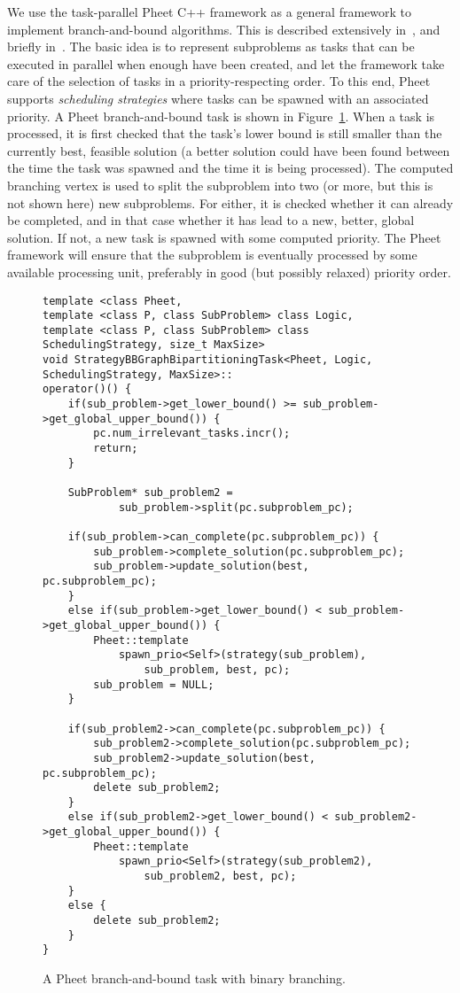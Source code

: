 \documentclass[a4paper,11pt]{article}
\begin{document}
We use the task-parallel Pheet C++ framework as a general framework to
implement branch-and-bound algorithms. This is described extensively
in~\cite{Wimmer14:diss}, and briefly
in~\cite{Traff13:strategies,Traff14:priosched}. The basic idea is to
represent subproblems as tasks that can be executed in parallel when
enough have been created, and let the framework take care of the
selection of tasks in a priority-respecting order. To this end, Pheet
supports \emph{scheduling strategies} where tasks can be spawned with
an associated priority. A Pheet branch-and-bound task is shown in
Figure~\ref{fig:bbtask}. When a task is processed, it is first checked
that the task's lower bound is still smaller than the currently best,
feasible solution (a better solution could have been found between
the time the task was spawned and the time it is being processed).
The computed branching vertex is used to split the subproblem into two
(or more, but this is not shown here) new subproblems. For either, it
is checked whether it can already be completed, and in that case
whether it has lead to a new, better, global solution. If not, a new
task is spawned with some computed priority. The Pheet framework
will ensure that the subproblem is eventually processed by some
available processing unit, preferably in good (but possibly relaxed)
priority order.

\begin{figure}
\begin{lstlisting}[mathescape=true,columns=flexible]
template <class Pheet, 
template <class P, class SubProblem> class Logic, 
template <class P, class SubProblem> class SchedulingStrategy, size_t MaxSize>
void StrategyBBGraphBipartitioningTask<Pheet, Logic, SchedulingStrategy, MaxSize>::
operator()() {
	if(sub_problem->get_lower_bound() >= sub_problem->get_global_upper_bound()) {
		pc.num_irrelevant_tasks.incr();
		return;
	}

	SubProblem* sub_problem2 =
			sub_problem->split(pc.subproblem_pc);

	if(sub_problem->can_complete(pc.subproblem_pc)) {
		sub_problem->complete_solution(pc.subproblem_pc);
		sub_problem->update_solution(best, pc.subproblem_pc);
	}
	else if(sub_problem->get_lower_bound() < sub_problem->get_global_upper_bound()) {
		Pheet::template
			spawn_prio<Self>(strategy(sub_problem),
				sub_problem, best, pc);
		sub_problem = NULL;
	}

	if(sub_problem2->can_complete(pc.subproblem_pc)) {
		sub_problem2->complete_solution(pc.subproblem_pc);
		sub_problem2->update_solution(best, pc.subproblem_pc);
		delete sub_problem2;
	}
	else if(sub_problem2->get_lower_bound() < sub_problem2->get_global_upper_bound()) {
		Pheet::template
			spawn_prio<Self>(strategy(sub_problem2),
				sub_problem2, best, pc);
	}
	else {
		delete sub_problem2;
	}
}
\end{lstlisting}
\caption{A Pheet branch-and-bound task with binary branching.}
\label{fig:bbtask}
\end{figure}
\end{document}
